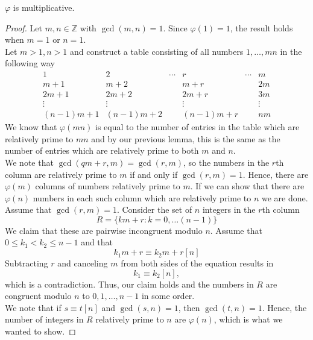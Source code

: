 \documentclass{report}
\newcommand{\Z}{\mathbb{Z}}
\begin{document}
\begin{thm} $\varphi$ is multiplicative.
\begin{proof}
Let $m, n\in \Z$ with $\gcd(m, n) = 1$. Since $\varphi(1)=1$, the result holds when $m=1$ or $n=1$.\\
Let $m>1, n>1$ and construct a table consisting of all numbers $1, \dots, mn$ in the following way
\begin{equation}\label{eulermatrix}
\begin{array}{rrrrrr}
1 & 2 & \cdots & r & \cdots & m\\
m + 1 & m + 2 & & m + r & & 2m\\
2m + 1 & 2m + 2 & & 2m + r & & 3m\\
\vdots & \vdots & & \vdots && \vdots\\
(n-1)m + 1 & (n-1)m + 2 & & (n-1)m + r & &nm
\end{array}
\end{equation}
We know that $\varphi(mn)$ is equal to the number of entries in the table which are relatively prime to $mn$ and by our previous lemma, this is the same as the number of entries which are relatively prime to both $m$ and $n$.\\
We note that $\gcd(qm + r, m) = \gcd(r, m)$, so the numbers in the $r$th column are relatively prime to $m$ if and only if $\gcd(r, m) = 1$. Hence, there are $\varphi(m)$ columns of numbers relatively prime to $m$. If we can show that there are $\varphi(n)$ numbers in each such column which are relatively prime to $n$ we are done.\\
Assume that $\gcd(r, m)=1$. Consider the set of $n$ integers in the $r$th column
\begin{equation*}
R = \{km + r : k=0, \dots (n-1)\}
\end{equation*}
We claim that these are pairwise incongruent modulo $n$. Assume that $0\leq k_1 < k_2 \leq n-1$ and that 
\begin{equation*}
k_1m + r\equiv k_2m + r[n]
\end{equation*}
Subtracting $r$ and canceling $m$ from both sides of the equation results in 
\begin{equation*}
k_1\equiv k_2[n],
\end{equation*}
which is a contradiction. Thus, our claim holds and the numbers in $R$ are congruent modulo $n$ to $0, 1, \dots, n-1$ in some order.\\
We note that if $s\equiv t[n]$ and $\gcd(s, n)=1$, then $\gcd(t, n)=1$. Hence, the number of integers in $R$ relatively prime to $n$ are $\varphi(n)$, which is what we wanted to show.
\end{proof}
\end{thm}
\end{document}
